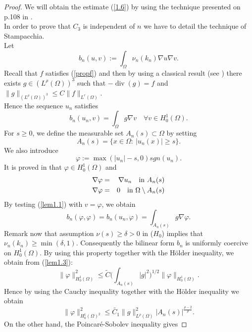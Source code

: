\documentclass{elsart}
\begin{document}
\begin{proof}
We will obtain the estimate (\ref{1.6}) by using the technique
presented on p.108 in \cite{stam}. \\ 
In order to prove that $C_3$ is independent of $n$ we have to detail
the technique of Stampacchia. \\ 
Let 
$$b_n(u,v):=\int_{\Omega} \nu_n(k_n) \nabla u \nabla v.$$
Recall that $f$ satisfies (\ref{propf}) and then by using a
classical result (see \cite{brezis}) there exists 
$g \in (L^{\rho}(\Omega))^3$ such that $-{\operatorname{div}}(g)=f$ and 
$\|g\|_{(L^{\rho}(\Omega))^3} \leq C \|f\|_{L^r(\Omega)}$. \\ 
Hence the sequence $u_n$ satisfies 
\begin{equation}
b_n(u_n,v) = \int_{\Omega} g \nabla v \quad \forall v \in
H^1_0(\Omega). \label{lem1.1}
\end{equation}
For $s \geq 0$, we define the measurable set $A_n(s) \subset
\Omega$ by setting 
$$A_n(s) = \big\{ x \in \Omega : \ |u_n(x)| \geq s \big\}.$$
We also introduce 
\begin{equation}
\varphi:=\max\left(|u_n|-s,0\right)sgn(u_n). \label{lem1.2}
\end{equation}
It is proved in \cite{stam} that $\varphi \in H^1_0(\Omega)$ and 
\begin{eqnarray}
\nabla \varphi &=& \nabla u_n \quad \text{in } A_n(s) \notag \\ 
\nabla \varphi &=& 0 \quad \text{in } \Omega \setminus A_n(s) \notag 
\end{eqnarray}
By testing (\ref{lem1.1}) with $v=\varphi$, we obtain 
\begin{equation} 
b_n(\varphi,\varphi)=b_n(u_n,\varphi)=\int_{A_n(s)} g \nabla \varphi.
\label{lem1.3}
\end{equation}
Remark now that assumption $\nu(s)\geq \delta > 0$ in ($H_0$) implies
that $\nu_n(k_n) \geq \min(\delta,1)$. Consequently the bilinear form
$b_n$ is uniformly coercive on $H^1_0(\Omega)$. By using this property
together with the H\"older inequality, we obtain from (\ref{lem1.3}): 
$$\|\varphi\|_{H^1_0(\Omega)}^2 \leq \tilde{C}\big( 
\int_{A_n(s)} |g|^2\big)^{1/2} \|\varphi\|_{H^1_0(\Omega)}.$$
Hence by using the Cauchy inequality together with the H\"older inequality we obtain 
\begin{equation}
\|\varphi\|^2_{H^1_0(\Omega)^2} \leq \tilde{C_1}  
\|g\|_{L^\rho(\Omega)}^2 \big| A_n(s) \big|^{\frac{\rho-2}{\rho}}. \label{lem1.4} 
\end{equation}
On the other hand, the Poincar\'e-Sobolev inequality gives 

\end{proof}
\end{document}
